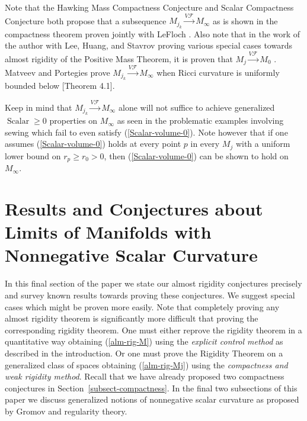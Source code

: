 \documentclass[12pt]{amsart}
\begin{document}
Note that the Hawking Mass Compactness Conjecture and
Scalar Compactness Conjecture both propose that a subsequence 
$M_{j_k} {\stackrel {V\mathcal{F}}{\longrightarrow} } M_\infty$ as is shown in the compactness
theorem proven jointly with LeFloch \cite{LeFloch-Sormani-1}.  
Also note that in the work of the author with Lee, Huang, and Stavrov
proving various special cases towards almost rigidity of the Positive
Mass Theorem, it is proven that $M_j {\stackrel {V\mathcal{F}}{\longrightarrow} } M_0$ \cite{LeeSormani1}\cite{HLS}\cite{Sormani-Stavrov-1}.   Matveev and Portegies 
prove $M_{j_k} {\stackrel {V\mathcal{F}}{\longrightarrow} } M_\infty$ when Ricci curvature is uniformly
bounded below \cite{Matveev-Portegies}[Theorem 4.1].

Keep in mind that $M_{j_k} {\stackrel {V\mathcal{F}}{\longrightarrow} } M_\infty$ alone will not suffice
to achieve generalized ${\operatorname{Scalar}}\ge 0$ properties on $M_\infty$
as seen in the problematic examples involving sewing which fail to even
satisfy (\ref{Scalar-volume-0}).   Note however that if one assumes
(\ref{Scalar-volume-0}) holds at every point $p$ in every $M_j$ 
with a uniform lower bound on $r_p\ge r_0>0$, then (\ref{Scalar-volume-0})
can be shown to hold on $M_\infty$.

\section{Results and Conjectures about Limits of Manifolds with Nonnegative Scalar Curvature}\label{sect-conj}

In this final section of the paper we state our almost rigidity conjectures
precisely and survey known results towards proving these conjectures.  We
suggest special cases which might be proven more easily.  Note that
completely proving any almost rigidity theorem is significantly more difficult that
proving the corresponding rigidity theorem.  One must either reprove
the rigidity theorem in a quantitative way obtaining (\ref{alm-rig-M}) using the
{\em explicit control method} as described in the introduction.  Or 
one must prove the Rigidity Theorem on a generalized class of spaces 
obtaining (\ref{alm-rig-Mj}) using the {\em compactness and weak rigidity method}.
Recall that we have already proposed two compactness
conjectures in Section~\ref{subsect-compactness}.    In the final two subsections
of this paper we discuss generalized notions of nonnegative
scalar curvature as proposed by Gromov and regularity theory.
\end{document}
